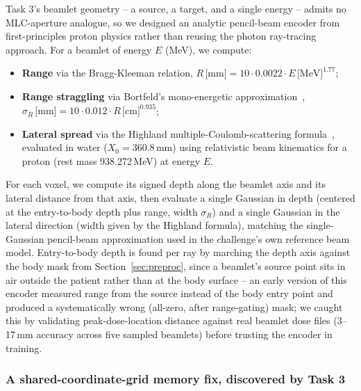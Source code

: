 \documentclass[10pt,conference]{IEEEtran}
\begin{document}
Task 3's beamlet geometry -- a source, a target, and a single energy --
admits no MLC-aperture analogue, so we designed an analytic
pencil-beam encoder from first-principles proton physics rather than
reusing the photon ray-tracing approach. For a beamlet of energy $E$
(MeV), we compute:
\begin{itemize}
    \item \textbf{Range} via the Bragg-Kleeman relation,
        $R\,\text{[mm]} = 10 \cdot 0.0022 \cdot E\,\text{[MeV]}^{1.77}$;
    \item \textbf{Range straggling} via Bortfeld's mono-energetic
        approximation~\cite{bortfeld1997},
        $\sigma_R\,\text{[mm]} = 10 \cdot 0.012 \cdot R\,\text{[cm]}^{0.935}$;
    \item \textbf{Lateral spread} via the Highland multiple-Coulomb-scattering
        formula~\cite{highland1975}, evaluated in water
        ($X_0 = 360.8$\,mm) using relativistic beam kinematics for a
        proton (rest mass 938.272\,MeV) at energy $E$.
\end{itemize}
For each voxel, we compute its signed depth along the beamlet axis and
its lateral distance from that axis, then evaluate a single Gaussian in
depth (centered at the entry-to-body depth plus range, width
$\sigma_R$) and a single Gaussian in the lateral direction (width given
by the Highland formula), matching the single-Gaussian pencil-beam
approximation used in the challenge's own reference beam model.
Entry-to-body depth is found per ray by marching the depth axis against
the body mask from Section~\ref{sec:preproc}, since a beamlet's source
point sits in air outside the patient rather than at the body surface --
an early version of this encoder measured range from the source instead
of the body entry point and produced a systematically wrong (all-zero,
after range-gating) mask; we caught this by validating peak-dose-location
distance against real beamlet dose files (3--17\,mm accuracy across five
sampled beamlets) before trusting the encoder in training.

\subsubsection{A shared-coordinate-grid memory fix, discovered by Task 3}
\end{document}
